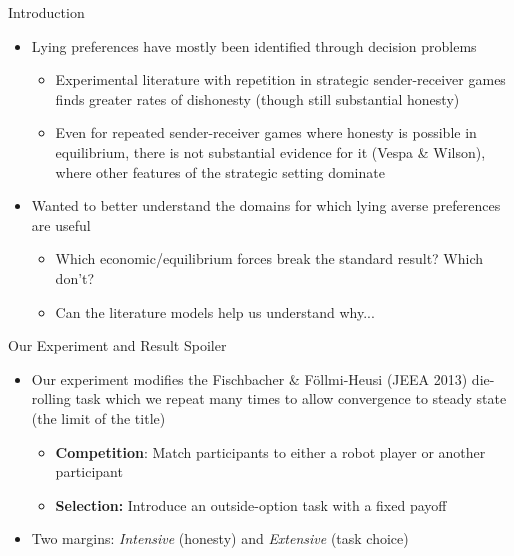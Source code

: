 \documentclass{beamer}
\begin{document}
\begin{frame}{Introduction}
    \begin{itemize}
        \item Lying preferences have mostly been identified through decision problems
            \begin{itemize}
                \item Experimental literature with repetition in strategic sender-receiver games finds greater rates of dishonesty (though still substantial honesty)
                \item Even for repeated sender-receiver games where honesty is possible in equilibrium, there is not substantial evidence for it (Vespa \& Wilson), where other features of the strategic setting dominate
            \end{itemize}
        \item Wanted to better understand the domains for which lying averse preferences
        are useful\pause 
            \begin{itemize}
                \item Which economic/equilibrium forces break the standard result? Which
                don't?
                \item Can the literature models help us understand why...
            \end{itemize}
    \end{itemize}
\end{frame}


\begin{frame}{Our Experiment and Result Spoiler}
    \begin{itemize}
        \item Our experiment modifies the Fischbacher \& F\"ollmi-Heusi (JEEA 2013) die-rolling task which we repeat many times to allow convergence to steady state (the limit of the title)
            \begin{itemize}
                \item \textbf{Competition}: Match participants to either a robot player or another participant
                \item \textbf{Selection:} Introduce an outside-option task with a fixed payoff
            \end{itemize}
        \item Two margins: \emph{Intensive} (honesty) and\emph{ Extensive} (task choice)
    \end{itemize}
\end{frame}
\end{document}

